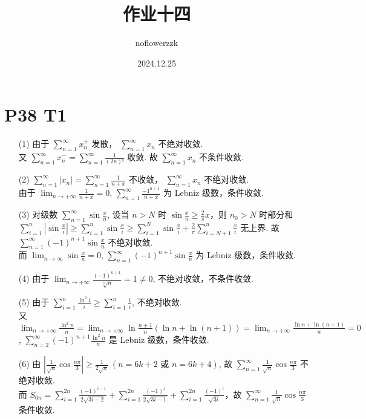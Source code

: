 \documentclass{article}
\title{作业十四}
\author{noflowerzzk}
\date{2024.12.25}
\newcommand{\sif}{\sum_{n = 1}^{\infty}}
\newcommand{\nti}{\lim_{n \to +\infty}}
\begin{document}
\maketitle

\section*{P38 T1}

\begin{itemize}
    \item [(1)] 由于 $\sif x_n^+$ 发散， $\sif x_n$ 不绝对收敛. \\
    又 $\sif x_n^- = \sif \frac{1}{(2n)!}$ 收敛. 故 $\sif x_n$ 不条件收敛.
    \item [(2)] $\sif \left\lvert x_n\right\rvert = \sif \frac{1}{n + x}$ 不收敛， $\sif x_n$ 不绝对收敛. \\
    由于 $\lim_{n \to +\infty}\frac{1}{n + x} = 0$, $\sif \frac{-1^{n + 1}}{n + x}$ 为 Lebniz 级数，条件收敛.
    \item [(3)] 对级数 $\sif \sin \frac{x}{n}$, 设当 $n > N$ 时 $\sin \frac{x}{n} \geqslant \frac{2}{\pi}x$，则 $n_0 > N$ 时部分和 $\sum_{i = 1}^{n}\left\lvert \sin \frac{x}{i}\right\rvert  \geqslant \sum_{i = 1}^{n}\sin \frac{x}{i} \geqslant \sum_{i = 1}^{N}\sin \frac{x}{i} + \frac{2}{\pi}\sum_{i = N + 1}^{n}\frac{x}{i}$ 无上界. 故 $\sif (-1)^{n + 1}\sin \frac{x}{n}$ 不绝对收敛. \\
    而 $\lim_{n \to \infty}\sin \frac{x}{n} = 0$, $\sif (-1)^{n + 1}\sin \frac{x}{n}$ 为 Lebniz 级数，条件收敛.
    \item [(4)] 由于 $\lim_{n \to +\infty}\frac{(-1)^{n + 1}}{\sqrt[n]{n}} = 1 \neq 0$, 不绝对收敛，不条件收敛.
    \item [(5)] 由于 $\sum_{i = 1}^{n}\frac{\ln^2 i}{i} \geqslant \sum_{i = 1}^{n}\frac{1}{i}$, 不绝对收敛. \\
    又 $\lim_{n \to +\infty}\frac{\ln^2 n}{n} = \nti \ln \frac{n + 1}{n}(\ln n + \ln (n + 1)) = \nti \frac{\ln n + \ln (n + 1)}{n} = 0$, $\sum_{n = 2}^{\infty}(-1)^{n + 1}\frac{\ln^2 n}{n}$ 是 Lebniz 级数，条件收敛.
    \item [(6)] 由 $\left\lvert \frac{1}{\sqrt{n}}\cos\frac{n \pi}{3}\right\rvert \geqslant \frac{1}{2\sqrt{n}}\ (n = 6k + 2 \text{ 或 } n = 6k + 4)$, 故 $\sif \frac{1}{\sqrt{n}}\cos\frac{n \pi}{3}$ 不绝对收敛. \\
    而 $S_{6n} = \sum_{i = 1}^{2n}\frac{(-1)^{i - 1}}{2\sqrt{3i - 2}} + \sum_{i = 1}^{2n}\frac{(-1)^{i}}{2\sqrt{3i - 1}} + \sum_{i = 1}^{2n}\frac{(-1)^i}{\sqrt{3i}}$，故 $\sif \frac{1}{\sqrt{n}}\cos\frac{n \pi}{3}$ 条件收敛.

\end{itemize}
\end{document}
